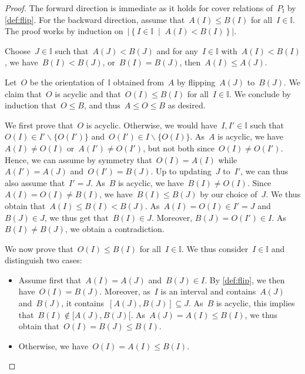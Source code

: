 \documentclass[reqno]{amsart}
\theoremstyle{definition}
\newcommand{\I}{\mathbb{I}} %
\newcommand{\set}[2]{\left\{ #1 \;\middle|\; #2 \right\}} %
\newcommand{\ssm}{\smallsetminus} %
\newcommand{\vincent}[1]{\todo[color=blue!30]{#1 \\ \hfill --- V.}}
\newcommand{\II}{\mathbb I} %
\begin{document}
\begin{proof}
The forward direction is immediate as it holds for cover relations of~$P_\II$ by \cref{def:flip}.
For the backward direction, assume that~$A(I) \le B(I)$ for all~$I \in \II$.
The proof works by induction on~$|\set{I \in \II}{A(I) < B(I)}|$.

Choose~$J \in \II$ such that~$A(J) < B(J)$ and for any~$I \in \II$ with~$A(I) < B(I)$, we have~$B(I) < B(J)$, or~$B(I) = B(J)$, then~$A(I) \le A(J)$.

Let~$O$ be the orientation of~$\I$ obtained from~$A$ by flipping~$A(J)$ to~$B(J)$.
We claim that~$O$ is acyclic and that~$O(I) \le B(I)$ for all~$I \in \II$. 
We conclude by induction that~$O \le B$, and thus~$A \le O \le B$ as desired.

We first prove that~$O$ is acyclic.
Otherwise, we would have~$I,I' \in \II$ such that~$O(I) \in I' \ssm \{O(I')\}$ and~$O(I') \in I \ssm \{O(I)\}$.
As~$A$ is acyclic, we have~$A(I) \ne O(I)$ or~$A(I') \ne O(I')$, but not both since~$O(I) \ne O(I')$.
Hence, we can assume by symmetry that~$O(I) = A(I)$ while~$A(I') = A(J)$ and~$O(I') = B(J)$.
Up to updating~$J$ to~$I'$, we can thus also assume that~$I' = J$.
As~$B$ is acyclic, we have~$B(I) \ne O(I)$.
Since~$A(I) = O(I) \ne B(I)$, we have~$B(I) \le B(J)$ by our choice of~$J$.
\vincent{Discard~$B(I) = B(J)??$}
We thus obtain that~$A(I) \le B(I) < B(J)$.
As~$A(I) = O(I) \in I' = J$ and~$B(J) \in J$, we thus get that~$B(I) \in J$.
Moreover, $B(J) = O(I') \in I$.
As~$B(I) \ne B(J)$, we obtain a contradiction.
\vincent{todo}

We now prove that~$O(I) \le B(I)$ for all~$I \in \II$.
We thus consider~$I \in \II$ and distinguish two cases:
\begin{itemize}
\item Assume first that~$A(I) = A(J)$ and~$B(J) \in I$. By \cref{def:flip}, we then have~${O(I) = B(J)}$. Moreover, as~$I$ is an interval and contains~$A(J)$ and~$B(J)$, it contains~$[A(J), B(J)] \subseteq J$. As~$B$ is acyclic, this implies that~$B(I) \notin {[A(J), B(J)[}$. As~$A(J) = A(I) \le B(I)$, we thus obtain that~$O(I) = B(J) \le B(I)$.
\item Otherwise, we have~$O(I) = A(I) \le B(I)$.
\qedhere
\end{itemize}
\end{proof}
\end{document}

